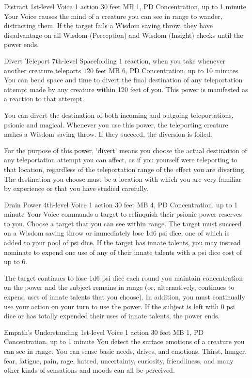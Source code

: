 \DndPowerHeader%
  {Distract}
  {1st-level Voice}
  {1 action}
  {30 feet}
  {MB 1, PD \lvlone}
  {Concentration, up to 1 minute}
Your Voice causes the mind of a creature you can see
in range to wander, distracting them.
If the target fails a Wisdom saving throw,
they have disadvantage on all Wisdom (Perception)
and Wisdom (Insight) checks until the power ends.

\DndPowerHeader%
  {Divert Teleport}
  {7th-level Spacefolding}
  {1 reaction, when you take whenever another creature teleports}
  {120 feet}
  {MB 6, PD \lvlseven}
  {Concentration, up to 10 minutes}
You can bend space and time to
divert the final destination of any teleportation attempt
made by any creature within 120 feet of you.
This power is manifested as a reaction to that attempt.

You can divert the destination of both incoming and outgoing
teleportations,
psionic and magical.
Whenever you use this power,
the teleporting creature makes a Wisdom saving throw.
If they succeed, the diversion is foiled.

For the purpose of this power,
`divert' means you choose the actual destination
of any teleportation attempt you can affect,
as if you yourself were teleporting to that location,
regardless of the teleportation range
of the effect you are diverting.
The destination you choose must be a location
with which you are very familiar by experience
or that you have studied carefully.
  
\DndPowerHeader%
  {Drain Power}
  {4th-level Voice}
  {1 action}
  {30 feet}
  {MB 4, PD \lvlfour}
  {Concentration, up to 1 minute}
Your Voice commands a target to relinquish their psionic power
reserves to you.
Choose a target that you can see within range.
The target must succeed on a Wisdom saving throw
or immediately lose 1d6 psi dice, one of which is added
to your pool of psi dice.
If the target has innate talents,
you may instead nominate to expend one use of
any of their innate talents with a psi dice cost of up to 6.

The target continues to lose 1d6 psi dice each round you
maintain concentration on the power and the subject remains
in range (or, alternatively, continues to expend uses of
innate talents that you choose).
In addition, you must continually use your action on your turn
to use the power.
If the subject is left with 0 psi dice
or has totally expended their uses of innate talents,
the power ends.

\DndPowerHeader%
  {Empath's Understanding}
  {1st-level Voice}
  {1 action}
  {30 feet}
  {MB 1, PD \lvlone}
  {Concentration, up to 1 minute}
You detect the surface emotions of a creature you can see in range.
You can sense basic needs, drives, and emotions.
Thirst, hunger, fear, fatigue, pain, rage, hatred, uncertainty,
curiosity, friendliness, and many other kinds of sensations and moods
can all be perceived.

